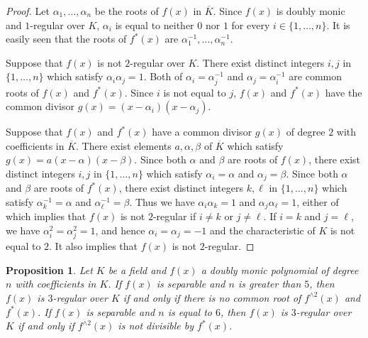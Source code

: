 \documentclass{amsart}
\theoremstyle{plain}
\newtheorem{prop}[thm]{Proposition}
\theoremstyle{definition}
\theoremstyle{remark}
\newcommand{\cb}{}
\begin{document}
\begin{proof}
Let $\alpha_1,\ldots ,\alpha_n$ be the roots of $f(x)$ in $\overline{K}$. 
Since $f(x)$ is doubly monic and $1$-regular over $K$, 
$\alpha_i$ is equal to neither $0$ nor $1$ for every $i\in\{1,\ldots ,n\}$. 
It is easily seen that the roots of $f^*(x)$ are $\alpha_1^{-1},\ldots ,\alpha_n^{-1}$. 

Suppose that $f(x)$ is not $2$-regular over $K$. 
There exist distinct integers $i,j$ in $\{1,\ldots ,n\}$ which satisfy $\alpha_i\alpha_j=1$. 
Both of $\alpha_i=\alpha_j^{-1}$ and $\alpha_j=\alpha_i^{-1}$ are common roots of 
$f(x)$ and $f^*(x)$. Since $i$ is not equal to $j$, $f(x)$ and $f^*(x)$ have the common divisor 
$g(x)=(x-\alpha_i)(x-\alpha_j)$. 

Suppose that $f(x)$ and $f^*(x)$ have a common divisor $g(x)$ of degree $2$ with coefficients 
in $\overline{K}$. There exist elements $a,\alpha,\beta$ of $\overline{K}$ 
which satisfy $g(x)=a(x-\alpha)(x-\beta)$. 
Since both $\alpha$ and $\beta$ are roots of $f(x)$, there exist distinct integers $i,j$ in $\{1,\ldots ,n\}$ 
which satisfy $\alpha_i=\alpha$ and $\alpha_j=\beta$. 
Since both $\alpha$ and $\beta$ are roots of $f^*(x)$, there exist distinct integers $k,\ell$ in $\{1,\ldots ,n\}$ 
which satisfy $\alpha_k^{-1}=\alpha$ and $\alpha_{\ell}^{-1}=\beta$. 
Thus we have $\alpha_i\alpha_k=1$ and $\alpha_j\alpha_{\ell}=1$, 
either of which implies that $f(x)$ is not $2$-regular if $i\ne k$ or $j\ne \ell$. 
If $i=k$ and $j=\ell$, we have $\alpha_i^2=\alpha_j^2=1$, 
and hence $\alpha_i=\alpha_j=-1$ and the characteristic of $K$ is not equal to $2$. 
It also implies that $f(x)$ is not $2$-regular. 
\end{proof}

\begin{prop}\label{3-regular}
Let $K$ be a field and 
$f(x)$ a doubly monic polynomial of degree $n$ with coefficients in $K$. 
If $f(x)$ is separable and $n$ is greater than $5$, 
then $f(x)$ is $3$-regular over $K$ if and only if there is no common root of 
$f^{\wedge 2}(x)$ and $f^*(x)$. 
If $f(x)$ is separable and $n$ is equal to $6$, 
then $f(x)$ is $3$-regular over $K$ if and only if 
$f^{\wedge 2}(x)$ is not
{\cb
divisible }
by $f^*(x)$.
\end{prop}
\end{document}
